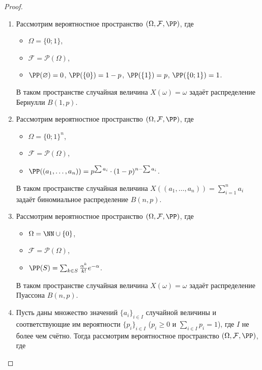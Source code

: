 \documentclass[12pt,a4paper]{article}
\begin{document}
    \begin{proof}
        \begin{enumerate}
            \item Рассмотрим вероятностное пространство $(\Omega, \mathcal{F}, \PP)$, где
                \begin{itemize}
                    \item $\Omega = \{0; 1\}$,
                    \item $\mathcal{F} = \mathcal{P}(\Omega)$,
                    \item $\PP(\varnothing) = 0$, $\PP(\{0\}) = 1-p$, $\PP(\{1\}) = p$, $\PP(\{0; 1\}) = 1$.
                \end{itemize}
                В таком пространстве случайная величина $X(\omega) = \omega$ задаёт распределение Бернулли $B(1, p)$.
            \item Рассмотрим вероятностное пространство $(\Omega, \mathcal{F}, \PP)$, где
                \begin{itemize}
                    \item $\Omega = \{0; 1\}^n$,
                    \item $\mathcal{F} = \mathcal{P}(\Omega)$,
                    \item $\PP((a_1, \dots, a_n)) = p^{\sum a_i} \cdot (1-p)^{n - \sum a_i}$.
                \end{itemize}
                В таком пространстве случайная величина $X((a_1, \dots, a_n)) = \sum_{i = 1}^n a_i$ задаёт биномиальное распределение $B(n, p)$.
            \item Рассмотрим вероятностное пространство $(\Omega, \mathcal{F}, \PP)$, где
                \begin{itemize}
                    \item $\Omega = \NN \cup \{0\}$,
                    \item $\mathcal{F} = \mathcal{P}(\Omega)$,
                    \item $\PP(S) = \sum_{k \in S} \frac{\alpha^k}{k!} e^{-\alpha}$.
                \end{itemize}
                В таком пространстве случайная величина $X(\omega) = \omega$ задаёт распределение Пуассона $B(n, p)$.
            \item Пусть даны множество значений $\{a_i\}_{i \in I}$ случайной величины и соответствующие им вероятности $\{p_i\}_{i \in I}$ ($p_i \geqslant 0$ и $\sum_{i \in I} p_i = 1$), где $I$ не более чем счётно. Тогда рассмотрим вероятностное пространство $(\Omega, \mathcal{F}, \PP)$, где

\end{enumerate}
\end{proof}
\end{document}
